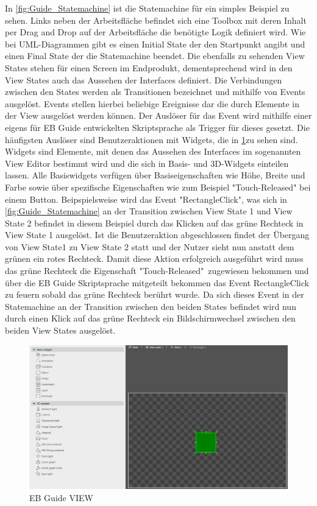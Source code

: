 In \cref{fig:Guide_Statemachine} ist die Statemachine für ein simples Beispiel zu sehen.
Links neben der Arbeitsfläche befindet sich eine Toolbox mit deren Inhalt per Drag and Drop auf der Arbeitsfläche die benötigte Logik definiert wird.
Wie bei UML-Diagrammen gibt es einen Initial State der den Startpunkt angibt und einen Final State der die Statemachine beendet.
Die ebenfalls zu sehenden View States stehen für einen Screen im Endprodukt, dementsprechend wird in den View States auch das Aussehen der Interfaces definiert.
Die Verbindungen zwischen den States werden als Transitionen bezeichnet und mithilfe von Events ausgelöst.
Events stellen hierbei beliebige Ereignisse dar die durch Elemente in der View ausgelöst werden können.
Der Auslöser für das Event wird mithilfe einer eigens für EB Guide entwickelten Skriptsprache als Trigger für dieses gesetzt.
Die häufigsten Auslöser sind Benutzeraktionen mit Widgets, die in \cref{fig:Guide_View}zu sehen sind.
Widgets sind Elemente, mit denen das Aussehen des Interfaces im sogenannten View Editor bestimmt wird und die sich in Basis- und 3D-Widgets einteilen lassen.
Alle Basiswidgets verfügen über Basiseigenschaften wie Höhe, Breite und Farbe sowie über spezifische Eigenschaften wie zum Beispiel "Touch-Released" bei einem Button.\cite{studio_guide}
Beipspielsweise wird das Event "RectangleClick", was sich in \cref{fig:Guide_Statemachine} an der Transition zwischen View State 1 und View State 2 befindet in diesem Beispiel durch das Klicken auf das grüne Rechteck in View State 1 ausgelöst.
Ist die Benutzeraktion abgeschlossen findet der Übergang von View State1 zu View State 2 statt und der Nutzer sieht nun anstatt dem grünen ein rotes Rechteck.
Damit diese Aktion erfolgreich ausgeführt wird muss das grüne Rechteck die Eigenschaft "Touch-Released"\ zugewiesen bekommen und über die EB Guide Skriptsprache mitgeteilt bekommen das Event RectangleClick zu feuern sobald das grüne Rechteck berührt wurde.
Da sich dieses Event in der Statemachine an der Transition zwischen den beiden States befindet wird nun durch einen Klick auf das grüne Rechteck ein Bildschirmwechsel zwischen den beiden View States ausgelöst.

\begin{figure}[H]
\begin{center}
  \includegraphics[scale=0.4]{figures/Guide_View.PNG}
  \caption{EB Guide VIEW}
  \label{fig:Guide_View}
\end{center}
\end{figure}


